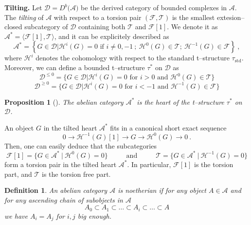 \documentclass[11pt]{article}
\newtheorem{definition}{Definition}
\newtheorem{proposition}[theorem]{Proposition}
\begin{document}
\noindent\textbf{Tilting.} Let $\mathcal{D}=D^b(\mathcal{A)}$ be the derived category of bounded complexes in $\mathcal{A}$. The \textit{tilting} of $\mathcal{A}$ with respect to a torsion pair $(\mathcal{F},\mathcal{T})$ is the smallest extesion--closed subcategory of $\mathcal{D}$ containing both $\mathcal{T}$ and $\mathcal{F}[1]$. We denote it as $\mathcal{A}^*=\langle\mathcal{F}[1],\mathcal{T}\rangle$, and it can be explicitely described as
\begin{equation}
    \mathcal{A}^{*} = \left\{G\in \mathcal{D}\Big|  \mathcal{H}^i(G) =0 \text{ if } i\neq 0,-1 \ ; \ \mathcal{H}^0(G) \in \mathcal{T} ; \ \mathcal{H}^{-1}(G) \in \mathcal{F}  
    \right\} \ ,
\end{equation}
where $\mathcal{H}^i$ denotes the cohomology with respect to the standard t--structure $\tau_{\operatorname{std}}$. Moreover, we can define a bounded t--structure $\tau^*$ on $\mathcal{D}$ as
\[
    \mathcal{D}^{\leq 0} = \{G \in \mathcal{D} \Big| \mathcal{H}^i(G)=0 \text{ for } i>0 \text{ and } \mathcal{H}^0(G)\in \mathcal{T}\}
\]
\[
    \mathcal{D}^{\geq 0} = \{G \in \mathcal{D} \Big| \mathcal{H}^i(G)=0 \text{ for } i<-1 \text{ and } \mathcal{H}^{-1}(G)\in \mathcal{F}\}
\]


\begin{proposition}[\cite{macri2019lecturesbridgelandstability}]
    The abelian category $\mathcal{A}^*$ is the heart of the t--structure $\tau^*$ on $\mathcal{D}$.
\end{proposition}

\noindent An object $G$ in the tilted heart $\mathcal{A}^*$ fits in a canonical short exact sequence
\begin{equation}\label{eqn : canonical ses tilting}
    0 \rightarrow \mathcal{H}^{-1}(G)[1] \rightarrow G \rightarrow \mathcal{H}^0(G) \rightarrow 0\ .
\end{equation}
Then, one can easily deduce that the subcategories
\[
    \mathcal{F}[1]=\{G\in \mathcal{A}^* \ \big|\ \mathcal{H}^0(G) =0 \} \hspace{1cm} \text{    and    } \hspace{1cm} \mathcal{T}=\{ G\in \mathcal{A}^* \ \big| \ \mathcal{H}^{-1}(G)=0\} 
\] 
form a torsion pair in the tilted heart $\mathcal{A}^*$. In particular, $\mathcal{F}[1]$ is the torsion part, and $\mathcal{T}$ is the torsion free part. 

\bigskip

\begin{definition}
    An abelian category $\mathcal{A}$ is \textit{noetherian} if for any object $A\in \mathcal{A}$ and for any ascending chain of subobjects in $\mathcal{A}$
    \[
        A_0\subset A_1 \subset \dots \subset A_i \subset \dots \subset A
    \]
    we have $A_i = A_j $ for $i,j$ big enough. 
\end{definition}
\end{document}
